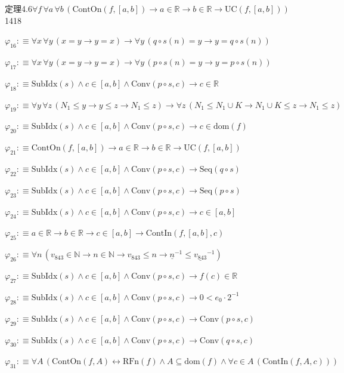 \begin{fullproof}{定理4.6}{$\forall f\,\forall a\,\forall b\,(\mathrm{ContOn}(f,[a,b]) \to a \in \mathbb{R} \to b \in \mathbb{R} \to \mathrm{UC}(f,[a,b]))$}{1418}
\begin{abbrevlist}
\item $\varphi_{16} :\equiv \forall x\,\forall y\,(x = y \to y = x) \to \forall y\,(q \circ s(n) = y \to y = q \circ s(n))$
\item $\varphi_{17} :\equiv \forall x\,\forall y\,(x = y \to y = x) \to \forall y\,(p \circ s(n) = y \to y = p \circ s(n))$
\item $\varphi_{18} :\equiv \mathrm{SubIdx}(s) \land c \in [a,b] \land \mathrm{Conv}(p \circ s,c) \to c \in \mathbb{R}$
\item $\varphi_{19} :\equiv \forall y\,\forall z\,(N_{1} \leq y \to y \leq z \to N_{1} \leq z) \to \forall z\,(N_{1} \leq N_{1} \cup K \to N_{1} \cup K \leq z \to N_{1} \leq z)$
\item $\varphi_{20} :\equiv \mathrm{SubIdx}(s) \land c \in [a,b] \land \mathrm{Conv}(p \circ s,c) \to c \in \mathrm{dom}(f)$
\item $\varphi_{21} :\equiv \mathrm{ContOn}(f,[a,b]) \to a \in \mathbb{R} \to b \in \mathbb{R} \to \mathrm{UC}(f,[a,b])$
\item $\varphi_{22} :\equiv \mathrm{SubIdx}(s) \land c \in [a,b] \land \mathrm{Conv}(p \circ s,c) \to \mathrm{Seq}(q \circ s)$
\item $\varphi_{23} :\equiv \mathrm{SubIdx}(s) \land c \in [a,b] \land \mathrm{Conv}(p \circ s,c) \to \mathrm{Seq}(p \circ s)$
\item $\varphi_{24} :\equiv \mathrm{SubIdx}(s) \land c \in [a,b] \land \mathrm{Conv}(p \circ s,c) \to c \in [a,b]$
\item $\varphi_{25} :\equiv a \in \mathbb{R} \to b \in \mathbb{R} \to c \in [a,b] \to \mathrm{ContIn}(f,[a,b],c)$
\item $\varphi_{26} :\equiv \forall n\,(v_{843} \in \mathbb{N} \to n \in \mathbb{N} \to v_{843} \leq n \to \underline{n}^{-1} \leq \underline{v_{843}}^{-1})$
\item $\varphi_{27} :\equiv \mathrm{SubIdx}(s) \land c \in [a,b] \land \mathrm{Conv}(p \circ s,c) \to f(c) \in \mathbb{R}$
\item $\varphi_{28} :\equiv \mathrm{SubIdx}(s) \land c \in [a,b] \land \mathrm{Conv}(p \circ s,c) \to 0 < e_{0} \cdot 2^{-1}$
\item $\varphi_{29} :\equiv \mathrm{SubIdx}(s) \land c \in [a,b] \land \mathrm{Conv}(p \circ s,c) \to \mathrm{Conv}(p \circ s,c)$
\item $\varphi_{30} :\equiv \mathrm{SubIdx}(s) \land c \in [a,b] \land \mathrm{Conv}(p \circ s,c) \to \mathrm{Conv}(q \circ s,c)$
\item $\varphi_{31} :\equiv \forall A\,(\mathrm{ContOn}(f,A) \leftrightarrow \mathrm{RFn}(f) \land A \subseteq \mathrm{dom}(f) \land \forall c \in A\,(\mathrm{ContIn}(f,A,c)))$

\end{abbrevlist}
\end{fullproof}
